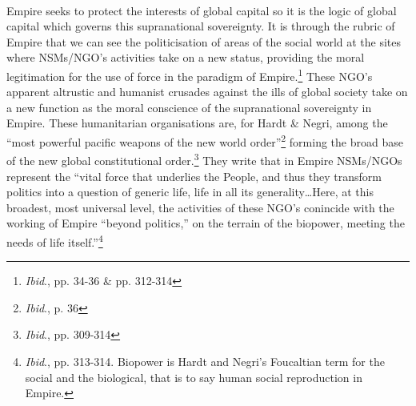 \paragraph{}Empire seeks to protect the interests of global capital so it is the logic of global capital which governs this supranational sovereignty. It is through the rubric of Empire that we can see the politicisation of areas of the social world at the sites where NSMs/NGO's activities take on a new status, providing the moral legitimation for the use of force in the paradigm of Empire.\footnote{\textit{Ibid}., pp. 34-36 \& pp. 312-314} These NGO's apparent altrustic and humanist crusades against the ills of global society take on a new function as the moral conscience of the supranational sovereignty in Empire. These humanitarian organisations are, for Hardt \& Negri, among the ``most powerful pacific weapons of the new world order''\footnote{\textit{Ibid}., p. 36} forming the broad base of the new global constitutional order.\footnote{\textit{Ibid}., pp. 309-314} They write that in Empire NSMs/NGOs represent the ``vital force that underlies the People, and thus they transform politics into a question of generic life, life in all its generality\ldots Here, at this broadest, most universal level, the activities of these NGO's conincide with the working of Empire ``beyond politics,'' on the terrain of the biopower, meeting the needs of life itself.''\footnote{\textit{Ibid}., pp. 313-314. Biopower is Hardt and Negri's Foucaltian term for the social and the biological, that is to say human social reproduction in Empire.}